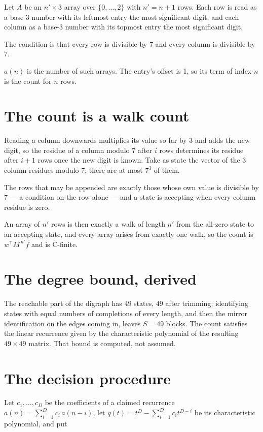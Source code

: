 \documentclass[11pt]{article}
\theoremstyle{definition}
\begin{document}
Let $A$ be an $n' \times 3$ array over $\{0,\dots,2\}$ with $n' = n + 1$ rows. Each row is read as a base-$3$ number with its leftmost entry the most significant digit, and each column as a base-$3$ number with its topmost entry the most significant digit.

The condition is that every row is divisible by $7$ and every column is divisible by $7$.

$a(n)$ is the number of such arrays. The entry's offset is 1, so its term of index $n$ is the count for $n$ rows.

\section{The count is a walk count}

Reading a column downwards multiplies its value so far by $3$ and adds the new digit, so the residue of a column modulo $7$ after $i$ rows determines its residue after $i+1$ rows once the new digit is known. Take as state the vector of the $3$ column residues modulo $7$; there are at most $7^{3}$ of them.

The rows that may be appended are exactly those whose own value is divisible by $7$ --- a condition on the row alone --- and a state is accepting when every column residue is zero.

An array of $n'$ rows is then exactly a walk of length $n'$ from the all-zero state to an accepting state, and every array arises from exactly one walk, so the count is $w^{\mathsf T}M^{\,n'}f$ and is C-finite.

\section{The degree bound, derived}

The reachable part of the digraph has $49$ states, $49$ after trimming; identifying states with equal numbers of completions of every length, and then the mirror identification on the edges coming in, leaves $S = 49$ blocks. The count satisfies the linear recurrence given by the characteristic polynomial of the resulting $49\times49$ matrix. That bound is computed, not assumed.

\section{The decision procedure}

Let $c_1,\dots,c_D$ be the coefficients of a claimed recurrence $a(n) = \sum_{i=1}^{D} c_i\,a(n-i)$, let $q(t) = t^{D} - \sum_{i=1}^{D} c_i t^{D-i}$ be its characteristic polynomial, and put
\end{document}
